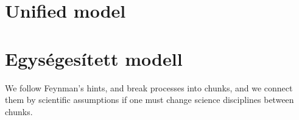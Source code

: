 
\ifx\magyar\undefined
\chapter[Unified model]{Unified model\label{sec:Modell-Unified}}
\else
\chapter[Egységesített modell]{Egységesített modell\label{sec:Modell-Unified}}
\fi

\iflatexml
\else
\minitoc
\fi


We follow Feynman's hints, and break processes into chunks,
and we connect them by scientific assumptions if
one must change science disciplines between chunks.


